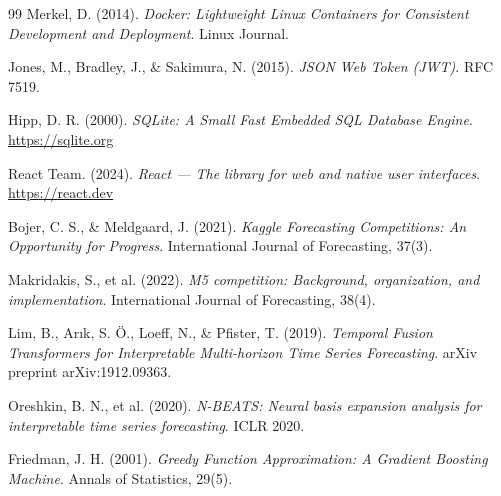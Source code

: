 \documentclass[12pt,a4paper]{report}
\begin{document}
\begin{thebibliography}{99}
Merkel, D. (2014). \textit{Docker: Lightweight Linux Containers for Consistent Development and Deployment}. Linux Journal.

Jones, M., Bradley, J., \& Sakimura, N. (2015). \textit{JSON Web Token (JWT)}. RFC 7519.

Hipp, D. R. (2000). \textit{SQLite: A Small Fast Embedded SQL Database Engine}. \url{https://sqlite.org}

React Team. (2024). \textit{React --- The library for web and native user interfaces}. \url{https://react.dev}

Bojer, C. S., \& Meldgaard, J. (2021). \textit{Kaggle Forecasting Competitions: An Opportunity for Progress}. International Journal of Forecasting, 37(3).

Makridakis, S., et al. (2022). \textit{M5 competition: Background, organization, and implementation}. International Journal of Forecasting, 38(4).

Lim, B., Arık, S. Ö., Loeff, N., \& Pfister, T. (2019). \textit{Temporal Fusion Transformers for Interpretable Multi-horizon Time Series Forecasting}. arXiv preprint arXiv:1912.09363.

Oreshkin, B. N., et al. (2020). \textit{N-BEATS: Neural basis expansion analysis for interpretable time series forecasting}. ICLR 2020.

Friedman, J. H. (2001). \textit{Greedy Function Approximation: A Gradient Boosting Machine}. Annals of Statistics, 29(5).

\end{thebibliography}
\end{document}

